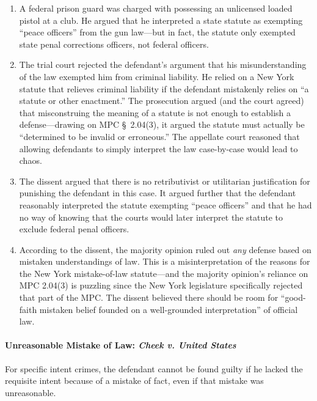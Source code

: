 \begin{enumerate}
    \item A federal prison guard was charged with possessing an unlicensed 
    loaded pistol at a club. He argued that he interpreted a state statute as 
    exempting ``peace officers'' from the gun law---but in fact, the statute 
    only exempted state penal corrections officers, not federal officers.
    \item The trial court rejected the defendant's argument that his 
    misunderstanding of the law exempted him from criminal liability. He 
    relied on a New York statute that relieves criminal liability if the 
    defendant mistakenly relies on ``a statute or other enactment.'' The 
    prosecution argued (and the court agreed) that misconstruing the meaning 
    of a statute is not enough to establish a defense---drawing on MPC \S\
    2.04(3), it argued the statute must actually be ``determined to be invalid 
    or erroneous.'' The appellate court reasoned that allowing defendants to 
    simply interpret the law case-by-case would lead to chaos.
    \item The dissent argued that there is no retributivist or utilitarian 
    justification for punishing the defendant in this case. It argued further 
    that the defendant reasonably interpreted the statute exempting ``peace 
    officers'' and that he had no way of knowing that the courts would later 
    interpret the statute to exclude federal penal officers.
    \item According to the dissent, the majority opinion ruled out \emph{any} 
    defense based on mistaken understandings of law. This is a 
    misinterpretation of the reasons for the New York mistake-of-law 
    statute---and the majority opinion's reliance on MPC 2.04(3) is puzzling 
    since the New York legislature specifically rejected that part of the MPC.  
    The dissent believed there should be room for ``good-faith mistaken belief 
    founded on a well-grounded interpretation'' of official law.
\end{enumerate}

\paragraph{Unreasonable Mistake of Law: \emph{Cheek v. United States}}

For specific intent crimes, the defendant cannot be found guilty if he lacked 
the requisite intent because of a mistake of fact, even if that mistake was 
unreasonable.

